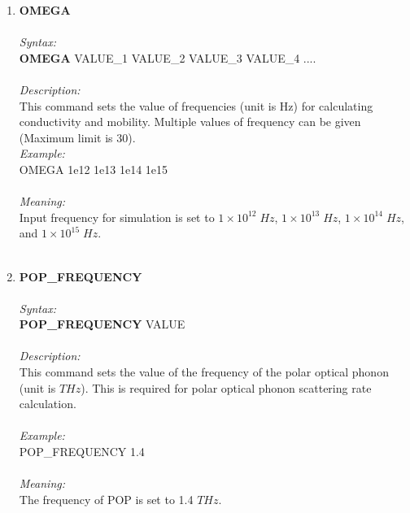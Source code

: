 \documentclass[12pt]{article}
\begin{document}
\begin{enumerate}
    \item \textbf{OMEGA}   \\ \\
    \textit{Syntax:} \\
    \textbf{OMEGA} VALUE\_1 VALUE\_2 VALUE\_3 VALUE\_4 .... \\ \\
    \textit{Description:} \\
    This command sets the value of frequencies (unit is Hz) for calculating conductivity and mobility. Multiple values of frequency can be given (Maximum limit is 30). \\
    \textit{Example:} \\
    OMEGA 1e12 1e13 1e14 1e15 \\ \\
    \textit{Meaning:} \\    
    Input frequency for simulation is set to $1 \times 10^{12} \; Hz$, $1 \times 10^{13} \; Hz$, $1 \times 10^{14} \; Hz$, and $1 \times 10^{15} \; Hz$. \\ \\


    \item \textbf{POP\_FREQUENCY}  \\ \\
    \textit{Syntax:} \\
    \textbf{POP\_FREQUENCY} VALUE \\ \\
    \textit{Description:} \\
    This command sets the value of the frequency of the polar optical phonon (unit is $THz$). This is required for polar optical phonon scattering rate calculation. \\ \\
    \textit{Example:} \\
    POP\_FREQUENCY 1.4 \\ \\
    \textit{Meaning:} \\   
    The frequency of POP is set to 1.4 $THz$. \\ \\ 


\end{enumerate}
\end{document}
